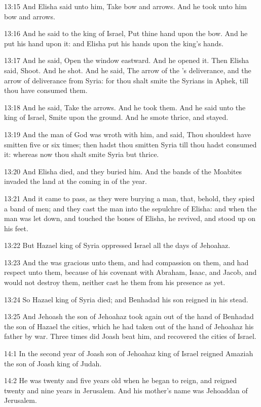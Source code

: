 13:15 And Elisha said unto him, Take bow and arrows. And he took unto
him bow and arrows.

13:16 And he said to the king of Israel, Put thine hand upon the bow.
And he put his hand upon it: and Elisha put his hands upon the king's
hands.

13:17 And he said, Open the window eastward. And he opened it. Then
Elisha said, Shoot. And he shot. And he said, The arrow of the \LORD's
deliverance, and the arrow of deliverance from Syria: for thou shalt
smite the Syrians in Aphek, till thou have consumed them.

13:18 And he said, Take the arrows. And he took them. And he said unto
the king of Israel, Smite upon the ground. And he smote thrice, and
stayed.

13:19 And the man of God was wroth with him, and said, Thou shouldest
have smitten five or six times; then hadst thou smitten Syria till
thou hadst consumed it: whereas now thou shalt smite Syria but thrice.

13:20 And Elisha died, and they buried him. And the bands of the
Moabites invaded the land at the coming in of the year.

13:21 And it came to pass, as they were burying a man, that, behold,
they spied a band of men; and they cast the man into the sepulchre of
Elisha: and when the man was let down, and touched the bones of
Elisha, he revived, and stood up on his feet.

13:22 But Hazael king of Syria oppressed Israel all the days of
Jehoahaz.

13:23 And the \LORD was gracious unto them, and had compassion on them,
and had respect unto them, because of his covenant with Abraham,
Isaac, and Jacob, and would not destroy them, neither cast he them
from his presence as yet.

13:24 So Hazael king of Syria died; and Benhadad his son reigned in
his stead.

13:25 And Jehoash the son of Jehoahaz took again out of the hand of
Benhadad the son of Hazael the cities, which he had taken out of the
hand of Jehoahaz his father by war. Three times did Joash beat him,
and recovered the cities of Israel.

14:1 In the second year of Joash son of Jehoahaz king of Israel
reigned Amaziah the son of Joash king of Judah.

14:2 He was twenty and five years old when he began to reign, and
reigned twenty and nine years in Jerusalem. And his mother's name was
Jehoaddan of Jerusalem.

